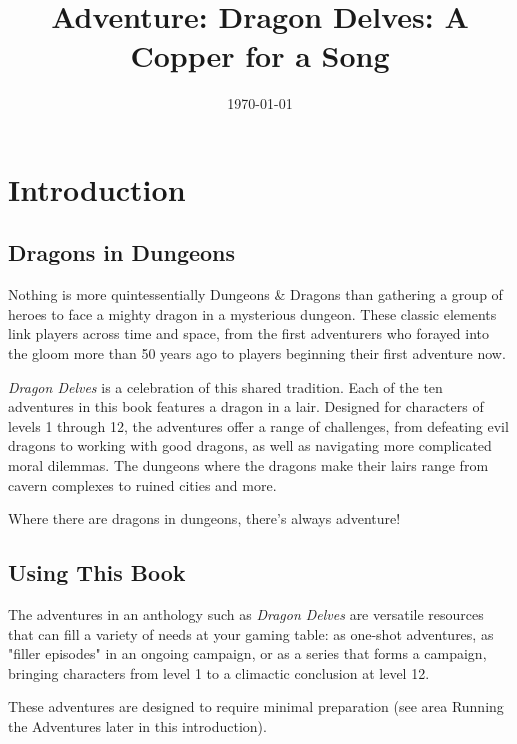 \documentclass[letterpaper, 11pt, twocolumn]{dndbook}
\title{Adventure: Dragon Delves: A Copper for a Song}
\date{\today}
\begin{document}
\frontmatter

\maketitle
\thispagestyle{empty}
\clearpage

\tableofcontents
\clearpage

\mainmatter

\chapter{Introduction}\label{ch:introduction-1-1}

\section{Dragons in Dungeons}

Nothing is more quintessentially Dungeons \& Dragons than gathering a group of heroes to face a mighty dragon in a mysterious dungeon. These classic elements link players across time and space, from the first adventurers who forayed into the gloom more than 50 years ago to players beginning their first adventure now.

\textit{Dragon Delves} is a celebration of this shared tradition. Each of the ten adventures in this book features a dragon in a lair. Designed for characters of levels 1 through 12, the adventures offer a range of challenges, from defeating evil dragons to working with good dragons, as well as navigating more complicated moral dilemmas. The dungeons where the dragons make their lairs range from cavern complexes to ruined cities and more.

Where there are dragons in dungeons, there's always adventure!
\section{Using This Book}

The adventures in an anthology such as \textit{Dragon Delves} are versatile resources that can fill a variety of needs at your gaming table: as one-shot adventures, as "filler episodes" in an ongoing campaign, or as a series that forms a campaign, bringing characters from level 1 to a climactic conclusion at level 12.

These adventures are designed to require minimal preparation (see area Running the Adventures later in this introduction).
\end{document}
